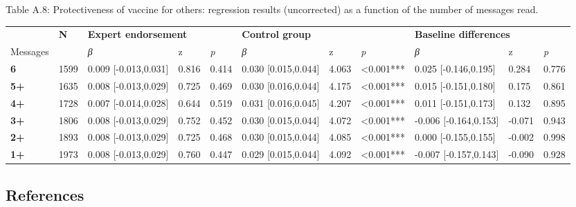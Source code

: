 \documentclass[authordate, empirical]{jote-new-article}
\begin{document}
	Table A.8: Protectiveness of vaccine for others: regression results (uncorrected) as a function of the number of messages read.

	\begin{table}
		\begin{tabularx}{\linewidth}{@{} l l l l l l l l l l l @{}}
			\hline  & \textbf{N} & \multicolumn{2}{l}{\textbf{Expert endorsement}} &  &
			\multicolumn{2}{l}{\textbf{Control group}} &  &
			\multicolumn{2}{l}{\textbf{Baseline differences}} &  \\

			 Messages &  & \emph{β} & z & \emph{p} & \emph{β} & z & \emph{p} &
			\emph{β} & z & \emph{p} \\

			\hline \textbf{6} & 1599 & 0.009 [-0.013,0.031] & 0.816 & 0.414 & 0.030 [0.015,0.044]
			& 4.063 & <0.001*** & 0.025 [-0.146,0.195] & 0.284 & 0.776 \\

			 \textbf{5+} & 1635 & 0.008 [-0.013,0.029] & 0.725 & 0.469 & 0.030 [0.016,0.044]
			& 4.175 & <0.001*** & 0.015 [-0.151,0.180] & 0.175 & 0.861 \\

			 \textbf{4+} & 1728 & 0.007 [-0.014,0.028] & 0.644 & 0.519 & 0.031 [0.016,0.045]
			& 4.207 & <0.001*** & 0.011 [-0.151,0.173] & 0.132 & 0.895 \\

			 \textbf{3+} & 1806 & 0.008 [-0.013,0.029] & 0.752 & 0.452 & 0.030 [0.015,0.044]
			& 4.072 & <0.001*** & -0.006 [-0.164,0.153] & -0.071 & 0.943 \\

			 \textbf{2+} & 1893 & 0.008 [-0.013,0.029] & 0.725 & 0.468 & 0.030 [0.015,0.044]
			& 4.085 & <0.001*** & 0.000 [-0.155,0.155] & -0.002 & 0.998 \\

			 \textbf{1+} & 1973 & 0.008 [-0.013,0.029] & 0.760 & 0.447 & 0.029 [0.015,0.044]
			& 4.092 & <0.001*** & -0.007 [-0.157,0.143] & -0.090 & 0.928 \\


		\end{tabularx}
	\end{table}



	\subsection{References}
\end{document}
